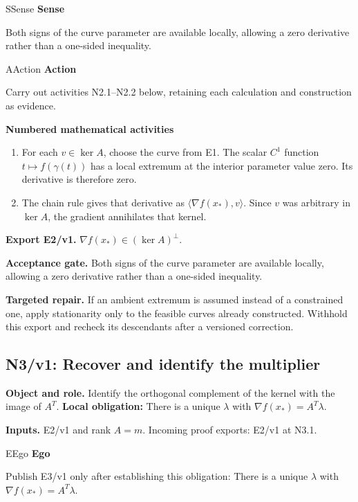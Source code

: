 \documentclass[preprint,12pt,aps,pra,showkeys,amsmath,amssymb,superscriptaddress,floatfix]{revtex4-2}
\theoremstyle{definition}
\theoremstyle{remark}
\newcommand{\mmfaculty}[3]{%
 \begin{mmfacultybox}{#1}{#2}
 {\sffamily\bfseries\color{MMBlue}#2}\par\smallskip #3
 \end{mmfacultybox}}
\newcommand{\field}[2]{\par\smallskip\noindent\textbf{#1.} #2\par}
\begin{document}
\mmfaculty{S}{Sense}{Both signs of the curve parameter are available locally, allowing a zero
derivative rather than a one-sided inequality.}

\mmfaculty{A}{Action}{Carry out activities N2.1--N2.2 below, retaining each calculation and
construction as evidence.}

\smallskip\noindent\textbf{Numbered mathematical activities}

\begin{enumerate}[label=N2.\arabic*,leftmargin=3.4em]

\item For each \(v\in\ker A\), choose the curve from E1. The scalar \(C^1\)
function \(t\mapsto f(\gamma(t))\) has a local extremum at the interior
parameter value zero. Its derivative is therefore zero.

\item The chain rule gives that derivative as
\(\langle\nabla f(x_*),v\rangle\). Since \(v\) was arbitrary in
\(\ker A\), the gradient annihilates that kernel.

\end{enumerate}

\field{Export E2/v1}{\(\nabla f(x_*)\in(\ker A)^\perp\).}

\field{Acceptance gate}{Both signs of the curve parameter are available locally, allowing a zero
derivative rather than a one-sided inequality.}

\field{Targeted repair}{If an ambient extremum is assumed instead of a constrained one, apply
stationarity only to the feasible curves already constructed. Withhold
this export and recheck its descendants after a versioned correction.}

\clearpage

\subsection{N3/v1: Recover and identify the multiplier}

\field{Object and role}{Identify the orthogonal complement of the kernel with the image of
\(A^T\). \textbf{Local obligation:} There is a unique \(\lambda\) with
\(\nabla f(x_*)=A^T\lambda\).}

\field{Inputs}{E2/v1 and rank \(A=m\). Incoming proof exports: E2/v1 at N3.1.}

\mmfaculty{E}{Ego}{Publish E3/v1 only after establishing this obligation: There is a unique
\(\lambda\) with \(\nabla f(x_*)=A^T\lambda\).}
\end{document}
